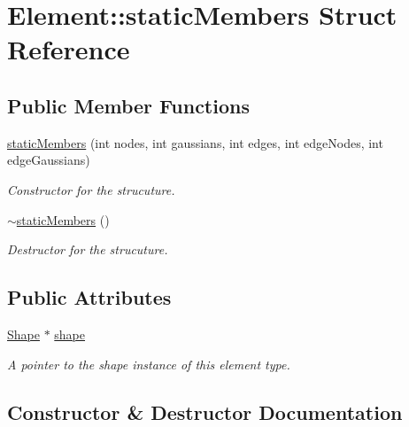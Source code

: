 \hypertarget{struct_element_1_1static_members}{}\section{Element\+:\+:static\+Members Struct Reference}
\label{struct_element_1_1static_members}
\subsection*{Public Member Functions}
\begin{DoxyCompactItemize}
\item 
\mbox{\hyperlink{struct_element_1_1static_members_a1686a16e7655673413d850e7ab8d0aea}{static\+Members}} (int nodes, int gaussians, int edges, int edge\+Nodes, int edge\+Gaussians)
\begin{DoxyCompactList}\small\item\em Constructor for the strucuture. \end{DoxyCompactList}\item 
\mbox{\label{struct_element_1_1static_members_afc6b24b9e09467da8f832c44e3aa9d1c}} 
\mbox{\hyperlink{struct_element_1_1static_members_afc6b24b9e09467da8f832c44e3aa9d1c}{$\sim$static\+Members}} ()
\begin{DoxyCompactList}\small\item\em Destructor for the strucuture. \end{DoxyCompactList}\end{DoxyCompactItemize}
\subsection*{Public Attributes}
\begin{DoxyCompactItemize}
\item 
\mbox{\hyperlink{class_shape}{Shape}} $\ast$ \mbox{\hyperlink{struct_element_1_1static_members_ae4cc99299c3d19da297d8faec65529c6}{shape}}
\begin{DoxyCompactList}\small\item\em A pointer to the shape instance of this element type. \end{DoxyCompactList}\end{DoxyCompactItemize}


\subsection{Constructor \& Destructor Documentation}
\mbox{\label{struct_element_1_1static_members_a1686a16e7655673413d850e7ab8d0aea}} 
